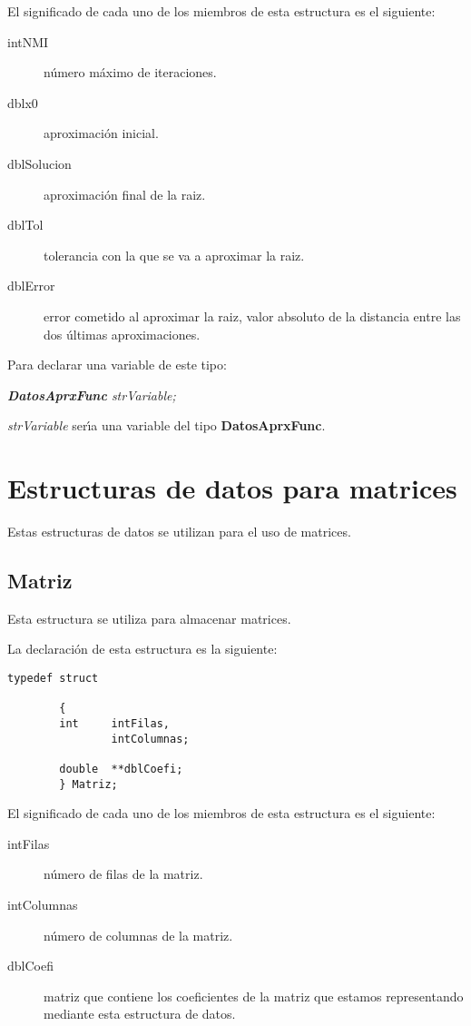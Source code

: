 El significado de cada uno de los miembros de esta estructura es el siguiente:

\begin{description}
\item[intNMI] n\'umero m\'aximo de iteraciones.
\item[dblx0] aproximaci\'on inicial.
\item[dblSolucion] aproximaci\'on final de la raiz.
\item[dblTol] tolerancia con la que se va a aproximar la raiz.
\item[dblError] error cometido al aproximar la raiz, valor absoluto de la 
distancia entre las dos \'ultimas aproximaciones.
\end{description}

Para declarar una variable de este tipo:

\begin{center}
\emph{\textbf{DatosAprxFunc} strVariable;}
\end{center}

\emph{strVariable} ser\'{\i}a una variable del tipo \textbf{DatosAprxFunc}.

\section{Estructuras de datos para matrices}

Estas estructuras de datos se utilizan para el uso de matrices.

\subsection{Matriz} \label{sec:strMatriz}

Esta estructura se utiliza para almacenar matrices.\newline

La declaraci\'on de esta estructura es la siguiente:

\begin{verbatim}
typedef struct

        {
        int     intFilas,
                intColumnas;

        double  **dblCoefi;
        } Matriz;
\end{verbatim}

El significado de cada uno de los miembros de esta estructura es el siguiente:

\begin{description}
\item[intFilas] n\'umero de filas de la matriz.
\item[intColumnas] n\'umero de columnas de la matriz.
\item[dblCoefi] matriz que contiene los coeficientes de la matriz que estamos
representando mediante esta estructura de datos.
\end{description}

